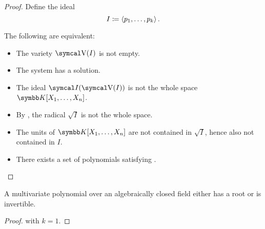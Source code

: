 \begin{proof}
  Define the ideal
  \begin{equation*}
    I \coloneqq \left\langle p_1, \ldots, p_k \right\rangle.
  \end{equation*}

  The following are equivalent:
  \begin{itemize}
    \item The variety \( \CV(I) \) is not empty.
    \item The system  has a solution.
    \item The ideal \( \Cal{I}(\CV(I)) \) is not the whole space \( \BK[X_1, \ldots, X_n] \).
    \item By , the radical \( \sqrt I \) is not the whole space.
    \item The units of \( \BK[X_1, \ldots, X_n] \) are not contained in \( \sqrt I \), hence also not contained in \( I \).
    \item There exists a set of polynomials satisfying .
  \end{itemize}
\end{proof}

\begin{Corollary}\label{thm:polynomial_over_closed_field_is_either_invertible_or_has_root}
  A multivariate polynomial over an algebraically closed field either has a root or is invertible.
\end{Corollary}
\begin{proof}
   with \( k = 1 \).
\end{proof}
